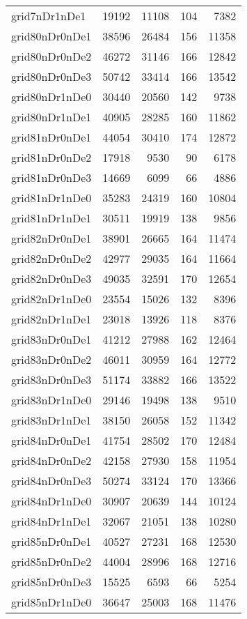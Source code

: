 \begin{longtable}{lrrrr}
grid7nDr1nDe1 & 19192 & 11108 & 104 & 7382 \\
grid80nDr0nDe1 & 38596 & 26484 & 156 & 11358 \\
grid80nDr0nDe2 & 46272 & 31146 & 166 & 12842 \\
grid80nDr0nDe3 & 50742 & 33414 & 166 & 13542 \\
grid80nDr1nDe0 & 30440 & 20560 & 142 & 9738 \\
grid80nDr1nDe1 & 40905 & 28285 & 160 & 11862 \\
grid81nDr0nDe1 & 44054 & 30410 & 174 & 12872 \\
grid81nDr0nDe2 & 17918 & 9530 & 90 & 6178 \\
grid81nDr0nDe3 & 14669 & 6099 & 66 & 4886 \\
grid81nDr1nDe0 & 35283 & 24319 & 160 & 10804 \\
grid81nDr1nDe1 & 30511 & 19919 & 138 & 9856 \\
grid82nDr0nDe1 & 38901 & 26665 & 164 & 11474 \\
grid82nDr0nDe2 & 42977 & 29035 & 164 & 11664 \\
grid82nDr0nDe3 & 49035 & 32591 & 170 & 12654 \\
grid82nDr1nDe0 & 23554 & 15026 & 132 & 8396 \\
grid82nDr1nDe1 & 23018 & 13926 & 118 & 8376 \\
grid83nDr0nDe1 & 41212 & 27988 & 162 & 12464 \\
grid83nDr0nDe2 & 46011 & 30959 & 164 & 12772 \\
grid83nDr0nDe3 & 51174 & 33882 & 166 & 13522 \\
grid83nDr1nDe0 & 29146 & 19498 & 138 & 9510 \\
grid83nDr1nDe1 & 38150 & 26058 & 152 & 11342 \\
grid84nDr0nDe1 & 41754 & 28502 & 170 & 12484 \\
grid84nDr0nDe2 & 42158 & 27930 & 158 & 11954 \\
grid84nDr0nDe3 & 50274 & 33124 & 170 & 13366 \\
grid84nDr1nDe0 & 30907 & 20639 & 144 & 10124 \\
grid84nDr1nDe1 & 32067 & 21051 & 138 & 10280 \\
grid85nDr0nDe1 & 40527 & 27231 & 168 & 12530 \\
grid85nDr0nDe2 & 44004 & 28996 & 168 & 12716 \\
grid85nDr0nDe3 & 15525 & 6593 & 66 & 5254 \\
grid85nDr1nDe0 & 36647 & 25003 & 168 & 11476 \\

\end{longtable}
